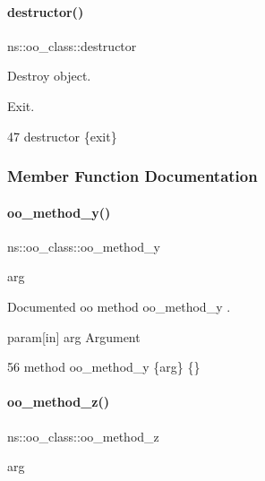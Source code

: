 \paragraph{\texorpdfstring{destructor()}{destructor()}}
{\footnotesize\ttfamily ns\+::oo\+\_\+class\+::destructor}



Destroy object. 

Exit. 
\begin{DoxyCode}
47     \textcolor{keyword}{destructor} \{\textcolor{keyword}{exit}\}
\end{DoxyCode}


\subsubsection{Member Function Documentation}
\hypertarget{classns_1_1oo__class_ad07feb192f34010ed66d123338c7acdd}{}\label{classns_1_1oo__class_ad07feb192f34010ed66d123338c7acdd} 
\paragraph{\texorpdfstring{oo\+\_\+method\+\_\+y()}{oo\_method\_y()}}
{\footnotesize\ttfamily ns\+::oo\+\_\+class\+::oo\+\_\+method\+\_\+y\begin{DoxyParamCaption}\item[{}]{arg  }\end{DoxyParamCaption}\hspace{0.3cm}{\ttfamily [protected]}}



Documented oo method {\ttfamily oo\+\_\+method\+\_\+y} . 

param\mbox{[}in\mbox{]} arg Argument 
\begin{DoxyCode}
56     \textcolor{keyword}{method} oo\_method\_y \{arg\} \{\}
\end{DoxyCode}
\hypertarget{classns_1_1oo__class_a8a3cfbae3b3fca463f08adb9174a5fe8}{}\label{classns_1_1oo__class_a8a3cfbae3b3fca463f08adb9174a5fe8} 
\paragraph{\texorpdfstring{oo\+\_\+method\+\_\+z()}{oo\_method\_z()}}
{\footnotesize\ttfamily ns\+::oo\+\_\+class\+::oo\+\_\+method\+\_\+z\begin{DoxyParamCaption}\item[{}]{arg  }\end{DoxyParamCaption}}



